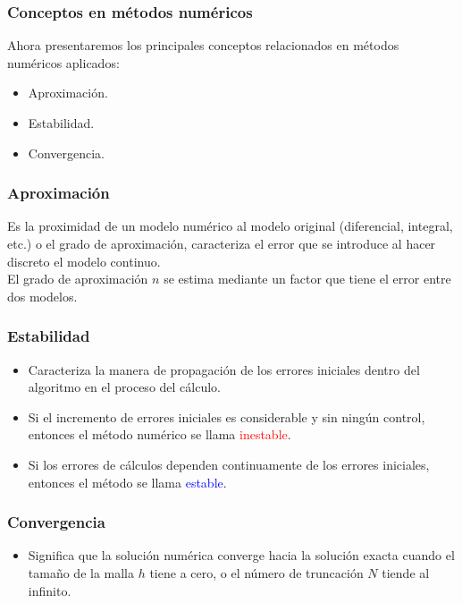 \begin{frame}
\frametitle{Conceptos en métodos numéricos}
Ahora presentaremos los principales conceptos relacionados en métodos numéricos aplicados:
\pause
\begin{itemize}[<+->]
\item Aproximación.
\item Estabilidad.
\item Convergencia.
\end{itemize}
\end{frame}
\begin{frame}
\frametitle{Aproximación}
Es la proximidad de un modelo numérico al modelo original (diferencial, integral, etc.) o el
grado de aproximación, caracteriza el error que se introduce al hacer discreto el modelo
continuo.
\\
\bigskip
El grado de aproximación $n$ se estima mediante un factor que tiene el error entre dos modelos.
\end{frame}
\begin{frame}
\frametitle{Estabilidad}
\begin{itemize}[<+->]
\item Caracteriza la manera de propagación de los errores iniciales dentro del algoritmo en el
proceso del cálculo.
\item Si el incremento de errores iniciales es considerable y sin ningún control, entonces el
método numérico se llama \textcolor{red}{inestable}.
\item Si los errores de cálculos dependen continuamente de los errores iniciales, entonces el método se llama \textcolor{blue}{estable}.
\end{itemize}
\end{frame}
\begin{frame}
\frametitle{Convergencia}
\begin{itemize}
\item  Significa que la solución numérica converge hacia la solución exacta cuando el tamaño de la malla $h$ tiene a cero, o el número de truncación $N$ tiende al infinito.
\end{itemize}
\end{frame}
